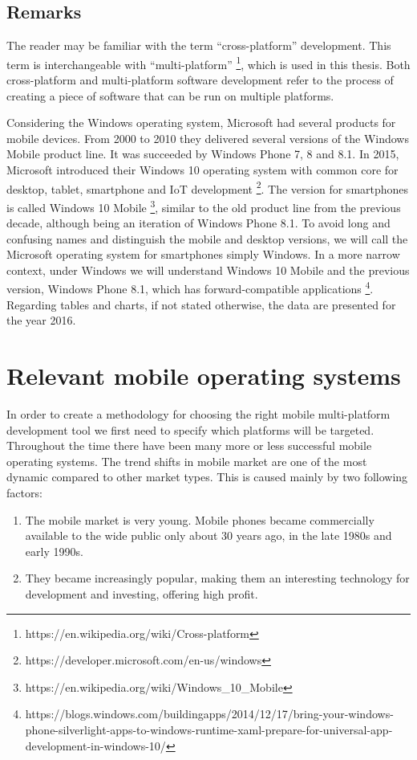 \documentclass[english,master,public,dept460,male,cpdeclaration,oneside]{diploma}
\begin{document}
\subsection{Remarks}
The reader may be familiar with the term “cross-platform” development. This term is interchangeable with “multi-platform” \footnote{https://en.wikipedia.org/wiki/Cross-platform}, which is used in this thesis. Both cross-platform and multi-platform software development refer to the process of creating a piece of software that can be run on multiple platforms.

Considering the Windows operating system, Microsoft had several products for mobile devices. From 2000 to 2010 they delivered several versions of the Windows Mobile product line. It was succeeded by Windows Phone 7, 8 and 8.1. In 2015, Microsoft introduced their Windows 10 operating system with common core for desktop, tablet, smartphone and IoT development \footnote{https://developer.microsoft.com/en-us/windows}. The version for smartphones is called Windows 10 Mobile \footnote{https://en.wikipedia.org/wiki/Windows\_10\_Mobile}, similar to the old product line from the previous decade, although being an iteration of Windows Phone 8.1. To avoid long and confusing names and distinguish the mobile and desktop versions, we will call the Microsoft operating system for smartphones simply Windows. In a more narrow context, under Windows we will understand Windows 10 Mobile and the previous version, Windows Phone 8.1, which has forward-compatible applications \footnote{https://blogs.windows.com/buildingapps/2014/12/17/bring-your-windows-phone-silverlight-apps-to-windows-runtime-xaml-prepare-for-universal-app-development-in-windows-10/}. 
Regarding tables and charts, if not stated otherwise, the data are presented for the year 2016.



\section{Relevant mobile operating systems}
In order to create a methodology for choosing the right mobile multi-platform development tool we first need to specify which platforms will be targeted. Throughout the time there have been many more or less successful mobile operating systems. The trend shifts in mobile market are one of the most dynamic compared to other market types. This is caused mainly by two following factors:
\begin{enumerate}
	\item The mobile market is very young. Mobile phones became commercially available to the wide public only about 30 years ago, in the late 1980s and early 1990s. 
	\item They became increasingly popular, making them an interesting technology for development and investing, offering high profit. 
\end{enumerate}
\end{document}
